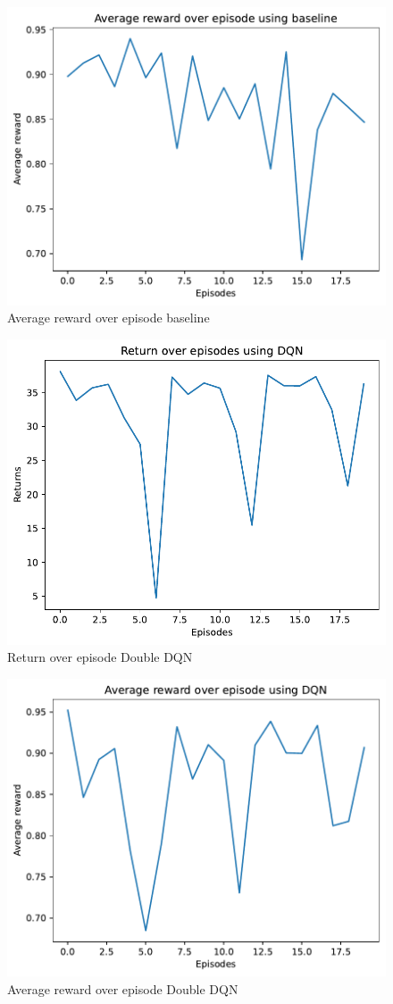 \documentclass{article}
\begin{document}
\begin{figure}
    \centering
    \includegraphics[width=0.7\linewidth]{img/Average_reward_over_episode_baseline.pdf}
    \caption{Average reward over episode baseline}
    \label{fig:Reward_episode_baseline}
\end{figure}

\begin{figure}
    \centering
    \includegraphics[width=0.7\linewidth]{img/Return_over_episode_DQN_4000.pdf}
    \caption{Return over episode Double DQN}
    \label{fig:Return_episode_DQN}
\end{figure}

\begin{figure}
    \centering
    \includegraphics[width=0.7\linewidth]{img/Average_reward_over_episode_DQN_4000.pdf}
    \caption{Average reward over episode Double DQN}
    \label{fig:Reward_episode_DQN}
\end{figure}
\end{document}

